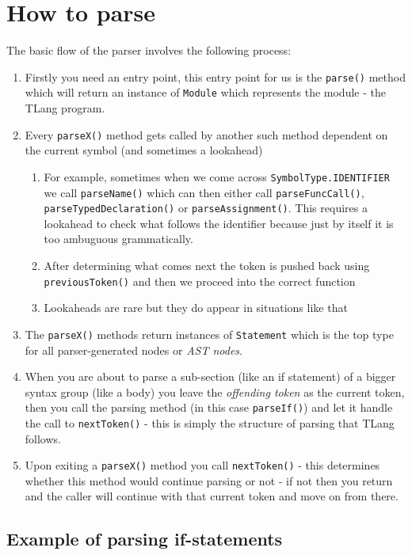 \section{How to parse}

The basic flow of the parser involves the following process:
\begin{enumerate}
\item Firstly you need an entry point, this entry point for us is the \texttt{parse()}
method which will return an instance of \texttt{Module} which represents
the module - the TLang program.
\item Every \texttt{parseX()} method gets called by another such method
dependent on the current symbol (and sometimes a lookahead)
\begin{enumerate}
\item For example, sometimes when we come across \texttt{SymbolType.IDENTIFIER}
we call \texttt{parseName()} which can then either call \texttt{parseFuncCall()},
\texttt{parseTypedDeclaration()} or \texttt{parseAssignment()}.
This requires a lookahead to check what follows the identifier because
just by itself it is too ambuguous grammatically.
\item After determining what comes next the token is pushed back using \texttt{previousToken()}
and then we proceed into the correct function
\item Lookaheads are rare but they do appear in situations like that
\end{enumerate}
\item The \texttt{parseX()} methods return instances of \texttt{Statement}
which is the top type for all parser-generated nodes or \emph{AST
nodes}.
\item When you are about to parse a sub-section (like an if statement) of
a bigger syntax group (like a body) you leave the \emph{offending
token} as the current token, then you call the parsing method (in
this case \texttt{parseIf()}) and let it handle the call to \texttt{nextToken()}
- this is simply the structure of parsing that TLang follows.
\item Upon exiting a \texttt{parseX()} method you call \texttt{nextToken()}
- this determines whether this method would continue parsing or not
- if not then you return and the caller will continue with that current
token and move on from there.
\end{enumerate}

\subsection{Example of parsing if-statements}

